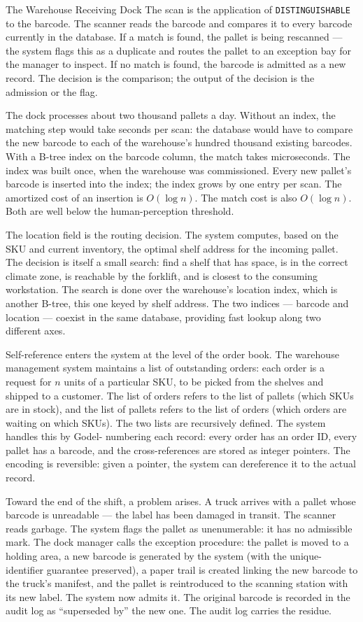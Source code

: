 \begin{coda}{The Warehouse Receiving Dock}
The scan is the application of \texttt{DISTINGUISHABLE} to the barcode.
The scanner reads the barcode and compares it to every barcode currently
in the database. If a match is found, the pallet is being rescanned ---
the system flags this as a duplicate and routes the pallet to an
exception bay for the manager to inspect. If no match is found, the
barcode is admitted as a new record. The decision is the comparison; the
output of the decision is the admission or the flag.

The dock processes about two thousand pallets a day. Without an index,
the matching step would take seconds per scan: the database would have
to compare the new barcode to each of the warehouse's hundred thousand
existing barcodes. With a B-tree index on the barcode column, the match
takes microseconds. The index was built once, when the warehouse was
commissioned. Every new pallet's barcode is inserted into the index; the
index grows by one entry per scan. The amortized cost of an insertion is
$O(\log n)$. The match cost is also $O(\log n)$. Both are well below the
human-perception threshold.

The location field is the routing decision. The system computes, based
on the SKU and current inventory, the optimal shelf address for the
incoming pallet. The decision is itself a small search: find a shelf that
has space, is in the correct climate zone, is reachable by the forklift,
and is closest to the consuming workstation. The search is done over the
warehouse's location index, which is another B-tree, this one keyed by
shelf address. The two indices --- barcode and location --- coexist in
the same database, providing fast lookup along two different axes.

Self-reference enters the system at the level of the order book. The
warehouse management system maintains a list of outstanding orders: each
order is a request for $n$ units of a particular SKU, to be picked from
the shelves and shipped to a customer. The list of orders refers to the
list of pallets (which SKUs are in stock), and the list of pallets
refers to the list of orders (which orders are waiting on which SKUs).
The two lists are recursively defined. The system handles this by Godel-
numbering each record: every order has an order ID, every pallet has a
barcode, and the cross-references are stored as integer pointers. The
encoding is reversible: given a pointer, the system can dereference it to
the actual record.

Toward the end of the shift, a problem arises. A truck arrives with a
pallet whose barcode is unreadable --- the label has been damaged in
transit. The scanner reads garbage. The system flags the pallet as
unenumerable: it has no admissible mark. The dock manager calls the
exception procedure: the pallet is moved to a holding area, a new
barcode is generated by the system (with the unique-identifier guarantee
preserved), a paper trail is created linking the new barcode to the
truck's manifest, and the pallet is reintroduced to the scanning station
with its new label. The system now admits it. The original barcode is
recorded in the audit log as ``superseded by'' the new one. The audit
log carries the residue.


\end{coda}
